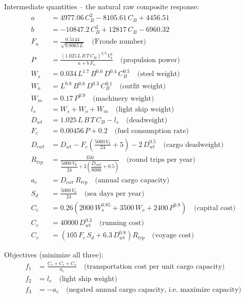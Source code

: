 \documentclass[11pt]{article}
\begin{document}
Intermediate quantities -- the natural raw composite response:
\begin{align}
a &= 4977.06\,C_B^2 - 8105.61\,C_B + 4456.51 \\
b &= -10847.2\,C_B^2 + 12817\,C_B - 6960.32 \\
F_n &= \frac{0.5144}{\sqrt{9.8065\,L}} \quad \text{(Froude number)} \\
P &= \frac{(1.025\,L\,B\,T\,C_B)^{2/3}\,V_k^3}{a + b\,F_n} \quad \text{(propulsion power)} \\
W_s &= 0.034\,L^{1.7}\,B^{0.6}\,D^{0.4}\,C_B^{0.5} \quad \text{(steel weight)} \\
W_o &= L^{0.8}\,B^{0.6}\,D^{0.3}\,C_B^{0.1} \quad \text{(outfit weight)} \\
W_m &= 0.17\,P^{0.9} \quad \text{(machinery weight)} \\
l_s &= W_s + W_o + W_m \quad \text{(light ship weight)} \\
D_{wt} &= 1.025\,L\,B\,T\,C_B - l_s \quad \text{(deadweight)} \\
F_c &= 0.00456\,P + 0.2 \quad \text{(fuel consumption rate)} \\
D_{cwt} &= D_{wt} - F_c\!\left(\frac{5000\,V_k}{24} + 5\right) - 2\,D_{wt}^{0.5} \quad \text{(cargo deadweight)} \\
R_{trp} &= \frac{350}{\dfrac{5000\,V_k}{24} + 2\!\left(\dfrac{D_{cwt}}{8000} + 0.5\right)} \quad \text{(round trips per year)} \\
a_c &= D_{cwt}\,R_{trp} \quad \text{(annual cargo capacity)} \\
S_d &= \frac{5000\,V_k}{24} \quad \text{(sea days per year)} \\
C_c &= 0.26\left(2000\,W_s^{0.85} + 3500\,W_o + 2400\,P^{0.8}\right) \quad \text{(capital cost)} \\
C_r &= 40000\,D_{wt}^{0.3} \quad \text{(running cost)} \\
C_v &= \left(105\,F_c\,S_d + 6.3\,D_{wt}^{0.8}\right) R_{trp} \quad \text{(voyage cost)}
\end{align}

Objectives (minimize all three):
\begin{align}
f_1 &= \frac{C_c + C_r + C_v}{a_c} \quad \text{(transportation cost per unit cargo capacity)} \\
f_2 &= l_s \quad \text{(light ship weight)} \\
f_3 &= -a_c \quad \text{(negated annual cargo capacity, i.e.\ maximize capacity)}
\end{align}
\end{document}
